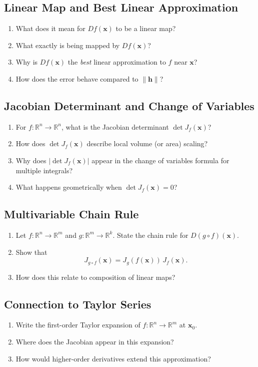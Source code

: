\subsection{Linear Map and Best Linear Approximation}
\begin{enumerate}[resume]
  \item What does it mean for $Df(\mathbf{x})$ to be a linear map?
  \item What exactly is being mapped by $Df(\mathbf{x})$?
  \item Why is $Df(\mathbf{x})$ the \emph{best} linear approximation to $f$ near $\mathbf{x}$?
  \item How does the error behave compared to $\|\mathbf{h}\|$?
\end{enumerate}

\subsection{Jacobian Determinant and Change of Variables}
\begin{enumerate}[resume]
  \item For $f : \mathbb{R}^n \to \mathbb{R}^n$, what is the Jacobian determinant $\det J_f(\mathbf{x})$?
  \item How does $\det J_f(\mathbf{x})$ describe local volume (or area) scaling?
  \item Why does $|\det J_f(\mathbf{x})|$ appear in the change of variables formula for multiple integrals?
  \item What happens geometrically when $\det J_f(\mathbf{x}) = 0$?
\end{enumerate}

\subsection{Multivariable Chain Rule}
\begin{enumerate}[resume]
  \item Let $f : \mathbb{R}^n \to \mathbb{R}^m$ and $g : \mathbb{R}^m \to \mathbb{R}^k$. State the chain rule for $D(g \circ f)(\mathbf{x})$.
  \item Show that
    \[
      J_{g \circ f}(\mathbf{x}) = J_g(f(\mathbf{x})) \, J_f(\mathbf{x}).
    \]
  \item How does this relate to composition of linear maps?
\end{enumerate}

\subsection{Connection to Taylor Series}
\begin{enumerate}[resume]
  \item Write the first-order Taylor expansion of $f : \mathbb{R}^n \to \mathbb{R}^m$ at $\mathbf{x}_0$.
  \item Where does the Jacobian appear in this expansion?
  \item How would higher-order derivatives extend this approximation?
\end{enumerate}


